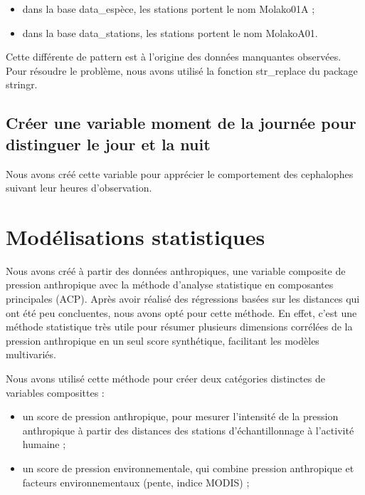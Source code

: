 \documentclass[
]{book}
\providecommand{\tightlist}{%
  \setlength{\itemsep}{0pt}\setlength{\parskip}{0pt}}
\begin{document}
\begin{itemize}
\tightlist
\item
  dans la base data\_espèce, les stations portent le nom Molako01A ;
\item
  dans la base data\_stations, les stations portent le nom MolakoA01.
\end{itemize}

Cette différente de pattern est à l'origine des données manquantes observées. Pour résoudre le problème, nous avons utilisé la fonction str\_replace du package stringr.

\subsection{Créer une variable moment de la journée pour distinguer le jour et la nuit}\label{cruxe9er-une-variable-moment-de-la-journuxe9e-pour-distinguer-le-jour-et-la-nuit}

Nous avons créé cette variable pour apprécier le comportement des cephalophes suivant leur heures d'observation.

\section{Modélisations statistiques}\label{moduxe9lisations-statistiques}

Nous avons créé à partir des données anthropiques, une variable composite de pression anthropique avec la méthode d'analyse statistique en composantes principales (ACP). Après avoir réalisé des régressions basées sur les distances qui ont été peu concluentes, nous avons opté pour cette méthode. En effet, c'est une méthode statistique très utile pour résumer plusieurs dimensions corrélées de la pression anthropique en un seul score synthétique, facilitant les modèles multivariés.

Nous avons utilisé cette méthode pour créer deux catégories distinctes de variables composittes :

\begin{itemize}
\item
  un score de pression anthropique, pour mesurer l'intensité de la pression anthropique à partir des distances des stations d'échantillonnage à l'activité humaine ;
\item
  un score de pression environnementale, qui combine pression anthropique et facteurs environnementaux (pente, indice MODIS) ;
\end{itemize}
\end{document}
